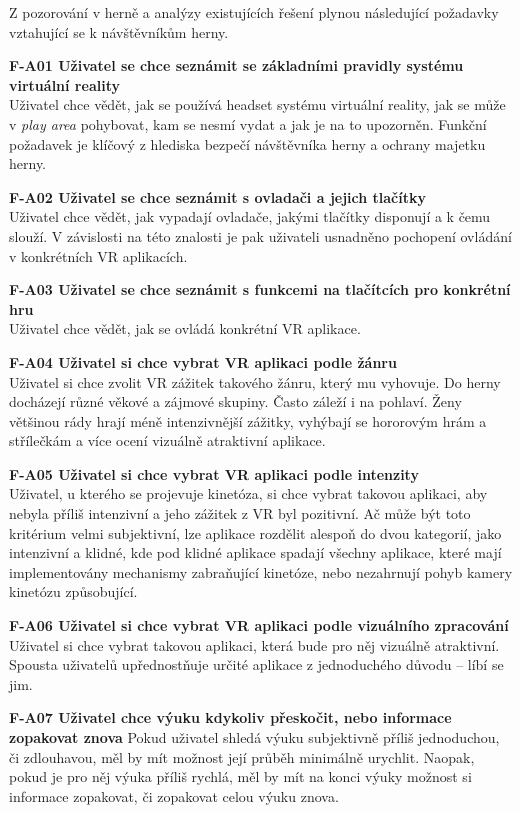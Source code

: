 Z pozorování v herně a analýzy existujících řešení plynou následující
požadavky vztahující se k návštěvníkům herny.

\textbf{F-A01 Uživatel se chce seznámit se základními pravidly systému
virtuální reality}\\
Uživatel chce vědět, jak se používá headset systému virtuální reality,
jak se může v \emph{play area} pohybovat, kam se nesmí vydat a jak je na
to upozorněn. Funkční požadavek je klíčový z hlediska bezpečí
návštěvníka herny a ochrany majetku herny.

\textbf{F-A02 Uživatel se chce seznámit s ovladači a jejich tlačítky}\\
Uživatel chce vědět, jak vypadají ovladače, jakými tlačítky disponují a
k čemu slouží. V závislosti na této znalosti je pak uživateli usnadněno
pochopení ovládání v konkrétních VR aplikacích.

\textbf{F-A03 Uživatel se chce seznámit s funkcemi na tlačítcích pro
konkrétní hru}\\
Uživatel chce vědět, jak se ovládá konkrétní VR aplikace.

\textbf{F-A04 Uživatel si chce vybrat VR aplikaci podle žánru}\\
Uživatel si chce zvolit VR zážitek takového žánru, který mu vyhovuje. Do
herny docházejí různé věkové a zájmové skupiny. Často záleží i na
pohlaví. Ženy většinou rády hrají méně intenzivnější zážitky, vyhýbají
se hororovým hrám a střílečkám a více ocení vizuálně atraktivní
aplikace.

\textbf{F-A05 Uživatel si chce vybrat VR aplikaci podle intenzity}\\
Uživatel, u kterého se projevuje kinetóza, si chce vybrat takovou
aplikaci, aby nebyla příliš intenzivní a jeho zážitek z VR byl
pozitivní. Ač může být toto kritérium velmi subjektivní, lze aplikace
rozdělit alespoň do dvou kategorií, jako intenzivní a klidné, kde pod
klidné aplikace spadají všechny aplikace, které mají implementovány
mechanismy zabraňující kinetóze, nebo nezahrnují pohyb kamery kinetózu
způsobující.

\textbf{F-A06 Uživatel si chce vybrat VR aplikaci podle vizuálního
zpracování}\\
Uživatel si chce vybrat takovou aplikaci, která bude pro něj vizuálně
atraktivní. Spousta uživatelů upřednostňuje určité aplikace z
jednoduchého důvodu -- líbí se jim.

\textbf{F-A07 Uživatel chce výuku kdykoliv přeskočit, nebo informace
zopakovat znova} Pokud uživatel shledá výuku subjektivně příliš
jednoduchou, či zdlouhavou, měl by mít možnost její průběh minimálně
urychlit. Naopak, pokud je pro něj výuka příliš rychlá, měl by mít na
konci výuky možnost si informace zopakovat, či zopakovat celou výuku
znova.

